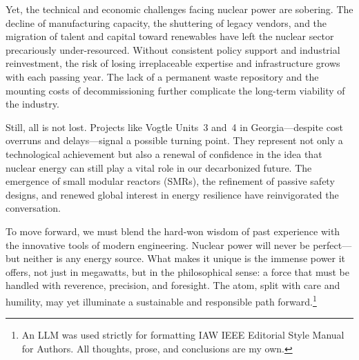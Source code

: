 \documentclass[12pt]{article}
\begin{document}
Yet, the technical and economic challenges facing nuclear power are sobering. The decline of manufacturing capacity, the shuttering of legacy vendors, and the migration of talent and capital toward renewables have left the nuclear sector precariously under-resourced. Without consistent policy support and industrial reinvestment, the risk of losing irreplaceable expertise and infrastructure grows with each passing year. The lack of a permanent waste repository and the mounting costs of decommissioning further complicate the long-term viability of the industry.

Still, all is not lost. Projects like Vogtle Units~3 and~4 in Georgia—despite cost overruns and delays—signal a possible turning point. They represent not only a technological achievement but also a renewal of confidence in the idea that nuclear energy can still play a vital role in our decarbonized future. The emergence of small modular reactors (SMRs), the refinement of passive safety designs, and renewed global interest in energy resilience have reinvigorated the conversation.

To move forward, we must blend the hard-won wisdom of past experience with the innovative tools of modern engineering. Nuclear power will never be perfect—but neither is any energy source. What makes it unique is the immense power it offers, not just in megawatts, but in the philosophical sense: a force that must be handled with reverence, precision, and foresight. The atom, split with care and humility, may yet illuminate a sustainable and responsible path forward.\footnote{An LLM was used strictly for formatting IAW IEEE Editorial Style Manual
	for Authors. All thoughts, prose, and conclusions are
my own.}
\newpage
{}
\begingroup
\sloppy
\printbibliography
\endgroup
\end{document}
